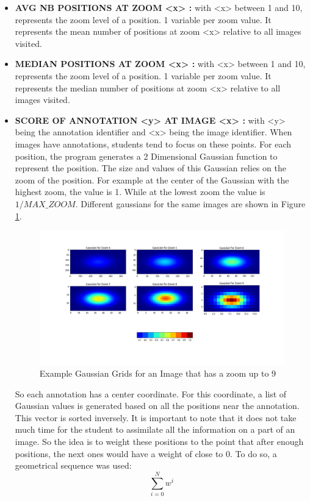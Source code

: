 \documentclass[a4paper,11pt]{report}
\numberwithin{figure}{chapter} %
\begin{document}
\begin{itemize}
    \item[\textbullet] \textbf{AVG NB POSITIONS AT ZOOM <x> :} with <x> between 1 and 10, represents the zoom level of a position.
    1 variable per zoom value.
    It represents the mean number of positions at zoom <x> relative to all images visited.\\
    \item[\textbullet] \textbf{MEDIAN POSITIONS AT ZOOM <x> :} with <x> between 1 and 10, represents the zoom level of a position.
    1 variable per zoom value.
    It represents the median number of positions at zoom <x> relative to all images visited.\\
    \item[\textbullet] \label{enum:score} \textbf{SCORE OF ANNOTATION <y> AT IMAGE <x> :} with <y> being the annotation identifier and <x> being the image identifier.
    When images have annotations, students tend to focus on these points.
    For each position, the program generates a 2 Dimensional Gaussian function to represent the position.
    The size and values of this Gaussian relies on the zoom of the position.
    For example at the center of the Gaussian with the highest zoom, the value is 1.
    While at the lowest zoom the value is $1/MAX\_ZOOM$.
    Different gaussians for the same images are shown in Figure \ref{fig:grids}.
    \begin{figure}[H]
\begin{center}
\includegraphics[scale=0.35]{plots/gaussian.png}
\caption{Example Gaussian Grids for an Image that has a zoom up to 9}
\label{fig:grids}
\end{center}
\end{figure}

   So each annotation has a center coordinate.
   For this coordinate, a list of Gaussian values is generated based on all the positions near the annotation.
   This vector is sorted inversely.
   It is important to note that it does not take much time for the student to assimilate all the information on a part of an image.
   So the idea is to weight these positions to the point that after enough positions, the next ones would have a weight of close to 0.
To do so, a geometrical sequence was used:
	\[\sum\limits_{i=0}^N w^i\]


\end{itemize}
\end{document}

